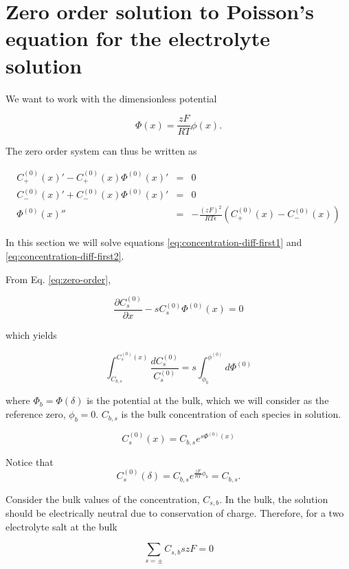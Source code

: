\newpage

\section{Zero order solution to Poisson's equation for the electrolyte solution}
\label{sec:zeroorderphi}

We want to work with the dimensionless potential 

$$\Phi(x) = \frac{zF}{RT}\phi(x).$$

The zero order system can thus be written as

\begin{eqnarray}
\label{eq:zero-order}
C^{(0)}_+(x)'-C^{(0)}_+(x)\Phi^{(0)}(x)' &=& 0\\
 C^{(0)}_-(x)'+C^{(0)}_-(x)\Phi^{(0)}(x)'&=& 0\\
\Phi^{(0)}(x) ''&=& -\frac{(zF)^2}{RT\epsilon} (C^{(0)}_{+}(x)-C^{(0)}_{-}(x))
\end{eqnarray}



In this section we will solve equations \ref{eq:concentration-diff-first1} and \ref{eq:concentration-diff-first2}. 

From Eq. \ref{eq:zero-order},

$$\frac{\partial C^{(0)}_s}{\partial x}-sC^{(0)}_s\Phi^{(0)}(x)= 0$$

which yields

$$\int_{C_{b,s}}^{C^{(0)}_s(x)} \frac{dC^{(0)}_s}{C^{(0)}_s}=s\int_{\phi_b}^{\phi^{(0)}} d\Phi^{(0)}$$

where $\Phi_b = \Phi(\delta)$ is the potential at the bulk, which we will consider as the reference zero, $\phi_b = 0$. $C_{b,s}$ is the bulk concentration of each species in solution.

$$C^{(0)}_s(x)=C_{b,s}e^{s\Phi^{(0)}(x)}$$

Notice that 
\begin{equation}
C^{(0)}_s(\delta) = C_{b,s}e^{\frac{zF}{RT}\phi_b}=C_{b,s}.
\label{eq:zero-order-sol-c}
\end{equation}

Consider the bulk values of the concentration, $C_{s,b}$. In the bulk, the solution should be electrically neutral due to conservation of charge. Therefore, for a two electrolyte salt at the bulk

\begin{equation}
\label{eq:electroneutrality}
\sum_{s=\pm} C_{s,b} sz F = 0
\end{equation}


